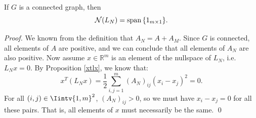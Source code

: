 \begin{proposition} \label{spanOfLn}
   If $G$ is a connected graph, then 
   \begin{equation}
      \mathcal N (L_N) = \operatorname{span\,} \{ 1_{m \times 1} \}.
   \end{equation}
\end{proposition}
\begin{proof}
   We known from the definition that $A_N = A + A_M$.
   Since $G$ is connected, all elements of $A$ are positive, and we can conclude that all elements of $A_N$ are also positive.
   Now assume $x \in \mathbb R ^{m}$ is an element of the nullspace of $L_N$, i.e. $L_N x = 0$.
   By Proposition \vref{xtlx}, we know that:
   \begin{equation*}
      x^T (L_N x) = \frac{1}{2} \sum_{i,j=1}^m (A_N)_{ij} (x_i - x_j)^2 = 0.
   \end{equation*}
   For all $(i,j) \in \Iintv{1,m}^2$, $(A_N)_{ij} > 0$, so we must have $x_i - x_j = 0$ for all these pairs.
   That is, all elements of $x$ must necessarily be the same. \qed
\end{proof}

